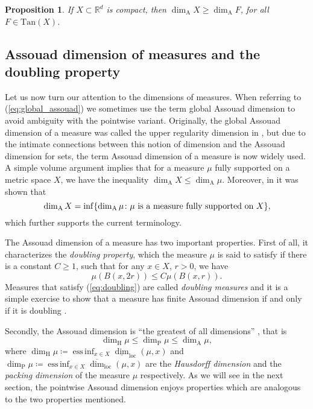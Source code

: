 \documentclass{PRM}
\newcommand{\field}[1]{\mathbb{#1}}
\newcommand{\R}{\field{R}}
\newcommand{\updim}{\overline{\dim}}
\newcommand{\lowdim}{\underline{\dim}}
\newcommand{\adim}{\dim_{\mathrm{A}}}
\DeclareMathOperator*{\essinf}{ess\,inf}
\theoremstyle{plain}
\newtheorem{prop}[thm]{Proposition}
\theoremstyle{definition}
\theoremstyle{remark}
\begin{document}
\begin{prop}\label{prop:weaktangent}
If $X\subset \R^d$ is compact, then $\dim_{\mathrm{A}} X\geq \dim_{\mathrm{A}}F$, for all $F\in\mathrm{Tan}(X)$.
\end{prop}

\subsection{Assouad dimension of measures and the doubling property}\label{subsec:assouad}
Let us now turn our attention to the dimensions of measures. When referring to (\ref{eq:global_assouad}) we sometimes use the term global Assouad dimension to avoid ambiguity with the pointwise variant. Originally, the global Assouad dimension of a measure was called the upper regularity dimension in \cite{KLV}, but due to the intimate connections between this notion of dimension and the Assouad dimension for sets, the term Assouad dimension of a measure is now widely used. A simple volume argument implies that for a measure $\mu$ fully supported on a metric space $X$, we have the inequality $\adim X\leq \adim\mu$. Moreover, in \cite{VK, LS} it was shown that
\begin{equation*}
    \adim X=\inf\{\adim\mu\colon \mu\textnormal{ is a measure fully supported on }X\},
\end{equation*}
which further supports the current terminology.

The Assouad dimension of a measure has two important properties. First of all, it characterizes the \emph{doubling property}, which the measure $\mu$ is said to satisfy if there is a constant $C\geq 1$, such that for any $x\in X$, $r>0$, we have
\begin{equation}\label{eq:doubling}
    \mu(B(x,2r))\leq C\mu(B(x,r)).
\end{equation}
Measures that satisfy (\ref{eq:doubling}) are called \emph{doubling measures} and it is a simple exercise to show that a measure has finite Assouad dimension if and only if it is doubling \cite[Lemma 4.1.1]{F}.

Secondly, the Assouad dimension is ``the greatest of all dimensions'' \cite{F}, that is
\begin{equation*}
    \dim_{\mathrm{H}}\mu\leq \dim_{\mathrm{P}}\mu\leq\adim\mu,
\end{equation*}
where $\dim_{\mathrm{H}}\mu\coloneqq\essinf_{x\in X}\lowdim_{\mathrm{loc}}(\mu,x)$ and $\dim_{\mathrm{P}}\mu\coloneqq\essinf_{x\in X}\updim_{\mathrm{loc}}(\mu,x)$ are the \emph{Hausdorff dimension} and the \emph{packing dimension} of the measure $\mu$ respectively. As we will see in the next section, the pointwise Assouad dimension enjoys properties which are analogous to the two properties mentioned.
\end{document}
